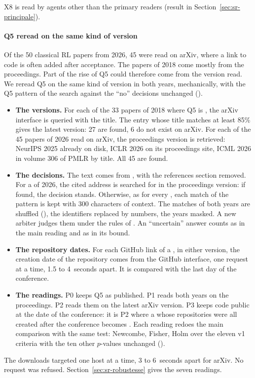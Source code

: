 X8 is read by agents other than the primary readers (result in
Section~\ref{sec:sr-principale}).

\paragraph{Q5 reread on the same kind of version}\label{sec:sm-versions}
Of the 50 classical RL papers from 2026, 45 were read on arXiv, where a link to code is often added after
acceptance. The papers of 2018 come mostly from the proceedings. Part of the rise of Q5 could therefore
come from the version read. We reread Q5 on the same kind of version in both years,
mechanically, with the Q5 pattern of the search against the \enquote{no} decisions unchanged ().
\begin{itemize}
  \item \textbf{The versions.} For each of the 33 papers of 2018 where Q5 is , the arXiv
  interface is queried with the title. The entry whose title matches at least 85\% gives the latest
  version: 27 are found, 6 do not exist on arXiv. For each of the 45 papers of 2026 read on arXiv, the
  proceedings version is retrieved: NeurIPS 2025 already on disk, ICLR 2026 on its proceedings site,
  ICML 2026 in volume 306 of PMLR by title. All 45 are found.
  \item \textbf{The decisions.} The text comes from , with the references section
  removed. For a  of 2026, the cited address is searched for in the proceedings version: if
  found, the decision stands. Otherwise, as for every , each match of the pattern is kept with
  300 characters of context. The matches of both years are shuffled (), the
  identifiers replaced by numbers, the years masked. A new arbiter judges them under the rules of
  . An \enquote{uncertain} answer counts as  in the main reading and as
   in its bound.
  \item \textbf{The repository dates.} For each GitHub link of a , in either version, the
  creation date of the repository comes from the GitHub interface, one request at a time, 1.5 to
  4~seconds apart. It is compared with the last day of the conference.
  \item \textbf{The readings.} P0 keeps Q5 as published. P1 reads both years on the proceedings. P2
  reads them on the latest arXiv version. P3 keeps code public at the date of the conference: it is P2
  where a  whose repositories were all created after the conference becomes . Each
  reading redoes the main comparison with the same test: Newcombe, Fisher, Holm over the eleven v1
  criteria with the ten other $p$-values unchanged ().
\end{itemize}
The downloads targeted one host at a time, 3 to 6~seconds apart for arXiv. No request was refused.
Section~\ref{sec:sr-robustesse} gives the seven readings.
